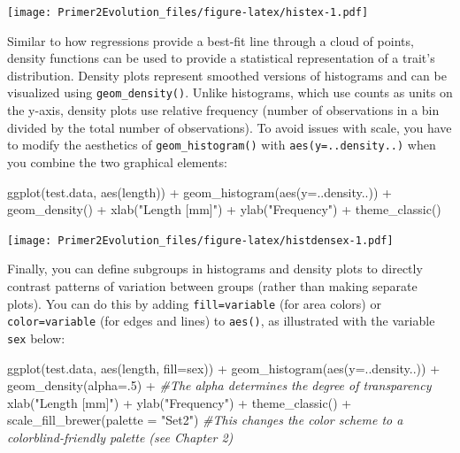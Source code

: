 \documentclass[
]{book}
\newenvironment{Shaded}{\begin{snugshade}}{\end{snugshade}}
\newcommand{\AttributeTok}[1]{\textcolor[rgb]{0.77,0.63,0.00}{#1}}
\newcommand{\CommentTok}[1]{\textcolor[rgb]{0.56,0.35,0.01}{\textit{#1}}}
\newcommand{\DecValTok}[1]{\textcolor[rgb]{0.00,0.00,0.81}{#1}}
\newcommand{\FunctionTok}[1]{\textcolor[rgb]{0.00,0.00,0.00}{#1}}
\newcommand{\NormalTok}[1]{#1}
\newcommand{\SpecialCharTok}[1]{\textcolor[rgb]{0.00,0.00,0.00}{#1}}
\newcommand{\StringTok}[1]{\textcolor[rgb]{0.31,0.60,0.02}{#1}}
\begin{document}
\texttt{[image: Primer2Evolution\_files/figure-latex/histex-1.pdf]}

Similar to how regressions provide a best-fit line through a cloud of points, density functions can be used to provide a statistical representation of a trait's distribution. Density plots represent smoothed versions of histograms and can be visualized using \texttt{geom\_density()}. Unlike histograms, which use counts as units on the y-axis, density plots use relative frequency (number of observations in a bin divided by the total number of observations). To avoid issues with scale, you have to modify the aesthetics of \texttt{geom\_histogram()} with \texttt{aes(y=..density..)} when you combine the two graphical elements:

\begin{Shaded}
\begin{Highlighting}[]
\FunctionTok{ggplot}\NormalTok{(test.data, }\FunctionTok{aes}\NormalTok{(length)) }\SpecialCharTok{+}
    \FunctionTok{geom\_histogram}\NormalTok{(}\FunctionTok{aes}\NormalTok{(}\AttributeTok{y=}\NormalTok{..density..)) }\SpecialCharTok{+}
    \FunctionTok{geom\_density}\NormalTok{() }\SpecialCharTok{+}
    \FunctionTok{xlab}\NormalTok{(}\StringTok{"Length [mm]"}\NormalTok{) }\SpecialCharTok{+}
    \FunctionTok{ylab}\NormalTok{(}\StringTok{"Frequency"}\NormalTok{) }\SpecialCharTok{+}
    \FunctionTok{theme\_classic}\NormalTok{()}
\end{Highlighting}
\end{Shaded}

\texttt{[image: Primer2Evolution\_files/figure-latex/histdensex-1.pdf]}

Finally, you can define subgroups in histograms and density plots to directly contrast patterns of variation between groups (rather than making separate plots). You can do this by adding \texttt{fill=variable} (for area colors) or \texttt{color=variable} (for edges and lines) to \texttt{aes()}, as illustrated with the variable \texttt{sex} below:

\begin{Shaded}
\begin{Highlighting}[]
\FunctionTok{ggplot}\NormalTok{(test.data, }\FunctionTok{aes}\NormalTok{(length, }\AttributeTok{fill=}\NormalTok{sex)) }\SpecialCharTok{+}
    \FunctionTok{geom\_histogram}\NormalTok{(}\FunctionTok{aes}\NormalTok{(}\AttributeTok{y=}\NormalTok{..density..)) }\SpecialCharTok{+}
    \FunctionTok{geom\_density}\NormalTok{(}\AttributeTok{alpha=}\NormalTok{.}\DecValTok{5}\NormalTok{) }\SpecialCharTok{+} \CommentTok{\#The alpha determines the degree of transparency}
    \FunctionTok{xlab}\NormalTok{(}\StringTok{"Length [mm]"}\NormalTok{) }\SpecialCharTok{+}
    \FunctionTok{ylab}\NormalTok{(}\StringTok{"Frequency"}\NormalTok{) }\SpecialCharTok{+}
    \FunctionTok{theme\_classic}\NormalTok{() }\SpecialCharTok{+}
    \FunctionTok{scale\_fill\_brewer}\NormalTok{(}\AttributeTok{palette =} \StringTok{"Set2"}\NormalTok{) }\CommentTok{\#This changes the color scheme to a colorblind{-}friendly palette (see Chapter 2)}
\end{Highlighting}
\end{Shaded}
\end{document}
